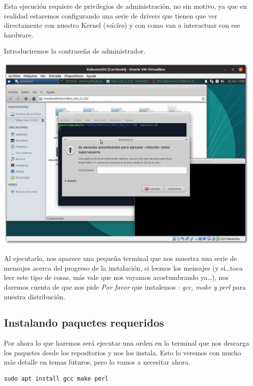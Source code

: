 \documentclass[11pt]{article}
\begin{document}
Esta ejecución requiere de privilegios de administración, no sin motivo,
ya que en realidad estaremos configurando una serie de drivers que
tienen que ver directamente con nuestro Kernel (\emph{núcleo}) y con como van
a interactuar con ese hardware.

Introduciremos la contraseña de administrador.

\begin{center}
\includegraphics[width=.9\linewidth]{imgs/VBox_GuestAdd_LinuX_018.png}
\end{center}

Al ejecutarlo, nos aparece una pequeña terminal que nos muestra una
serie de mensajes acerca del progreso de la instalación, si leemos los
mensajes (y sí\ldots{}toca leer este tipo de cosas, más vale que nos vayamos
acostumbrando ya\ldots{}), nos daremos cuenta de que nos pide \emph{Por favor} que
instalemos : \emph{gcc, make y perl} para nuestra distribución.

\subsection{Instalando paquetes requeridos}
\label{sec:org33035ac}
Por ahora lo que haremos será ejecutar una orden en la terminal que nos
descarga los paquetes desde los repositorios y nos los instala. Esto lo
veremos con mucho más detalle en temas futuros, pero lo vamos a
necesitar ahora.

\begin{verbatim}
sudo apt install gcc make perl
\end{verbatim}
\end{document}
